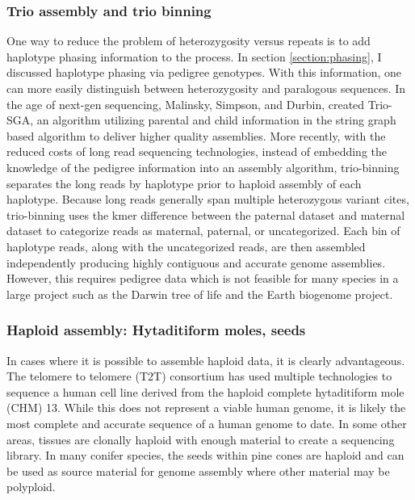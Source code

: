 \subsubsection{Trio assembly and trio binning}
\par{
One way to reduce the problem of heterozygosity versus repeats is to add haplotype phasing information to the process. In section \ref{section:phasing}, I discussed haplotype phasing via pedigree genotypes. With this information, one can more easily distinguish between heterozygosity and paralogous sequences. In the age of next-gen sequencing, Malinsky, Simpson, and Durbin, created Trio-SGA, an algorithm utilizing parental and child information in the string graph based algorithm to deliver higher quality assemblies\cite{trio-sga}. More recently, with the reduced costs of long read sequencing technologies, instead of embedding the knowledge of the pedigree information into an assembly algorithm, trio-binning\cite{triobinning} separates the long reads by haplotype prior to haploid assembly of each haplotype. Because long reads generally span multiple heterozygous variant cites, trio-binning uses the kmer difference between the paternal dataset and maternal dataset to categorize reads as maternal, paternal, or uncategorized. Each bin of haplotype reads, along with the uncategorized reads, are then assembled independently producing highly contiguous and accurate genome assemblies. However, this requires pedigree data which is not feasible for many species in a large project such as the Darwin tree of life and the Earth biogenome project.
}

\subsubsection{Haploid assembly: Hytaditiform moles, seeds}

\par{
In cases where it is possible to assemble haploid data, it is clearly advantageous. The telomere to telomere (T2T) consortium has used multiple technologies to sequence a human cell line derived from the haploid complete hytaditiform mole (CHM) 13\cite{T2T2}. While this does not represent a viable human genome, it is likely the most complete and accurate sequence of a human genome to date. In some other areas, tissues are clonally haploid with enough material to create a sequencing library. In many conifer species, the seeds within pine cones are haploid and can be used as source material for genome assembly where other material may be polyploid\cite{coniferhaploid}.
}
